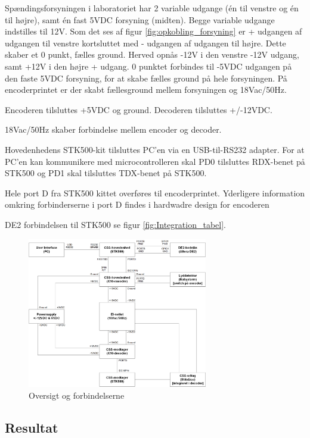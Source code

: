 Spændingsforsyningen i laboratoriet har 2 variable udgange (én til venstre og én til højre), samt én fast 5VDC forsyning (midten). Begge variable udgange indstilles til 12V. 
Som det ses af figur \ref{fig:opkobling_forsyning} er + udgangen af udgangen til venstre kortsluttet med - udgangen af udgangen til højre. Dette skaber et 0 punkt, fælles ground. Herved opnås -12V i den venstre -12V udgang, samt +12V i den højre + udgang. 0 punktet forbindes til -5VDC udgangen på den faste 5VDC forsyning, for at skabe fælles ground på hele forsyningen. På encoderprintet er der skabt fællesground mellem forsyningen og 18Vac/50Hz.

Encoderen tilsluttes +5VDC og ground.
Decoderen tilsluttes +/-12VDC.

18Vac/50Hz skaber forbindelse mellem encoder og decoder.

Hovedenhedens STK500-kit tilsluttes PC'en via en USB-til-RS232 adapter. For at PC'en kan kommunikere med microcontrolleren skal PD0 tilsluttes RDX-benet på STK500 og PD1 skal tilsluttes TDX-benet på STK500. 

Hele port D fra STK500 kittet overføres til encoderprintet. Yderligere information omkring forbinderserne i port D findes i hardwadre design for encoderen

DE2 forbindelsen til STK500 se figur \ref{fig:Integration_tabel}.

\begin{figure}[H]
	\centering
	\includegraphics[width=0.7\textwidth]{billeder/IntTest/Integration_oversigt}
	\caption{Oversigt og forbindelserne}
	\label{fig:integration_oversigt}
\end{figure}

\subsection{Resultat}

